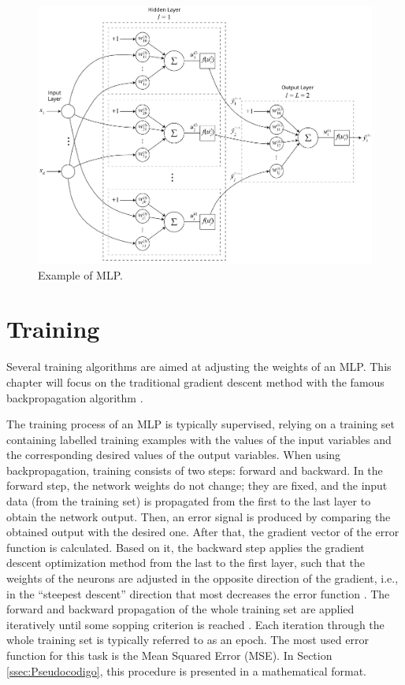 \begin{figure}[h!]
    \centering
    \includegraphics[width=1\textwidth]{"Part 3 - Learning Systems/Supervised Learning/Multilayer Perceptron/figures/MLP_v2@4x.png"}
    \caption{Example of MLP.}
    \label{fig:mlp}
\end{figure}





\section{Training}
\label{ssec:treino}

Several training algorithms are aimed at adjusting the weights of an MLP. This chapter will focus on the traditional gradient descent method with the famous backpropagation algorithm \cite{rumelhart1986learning}.

The training process of an MLP is typically supervised, relying on a training set containing labelled training examples with the values of the input variables and the corresponding desired values of the output variables. When using backpropagation, training consists of two steps: forward and backward. In the forward step, the network weights do not change; they are fixed, and the input data (from the training set) is propagated from the first to the last layer to obtain the network output. Then, an error signal is produced by comparing the obtained output with the desired one. After that, the gradient vector of the error function is calculated. Based on it, the backward step applies the gradient descent optimization method from the last to the first layer, such that the weights of the neurons are adjusted in the opposite direction of the gradient, i.e., in the ``steepest descent'' direction that most decreases the error function \cite{haykin}. The forward and backward propagation of the whole training set are applied iteratively until some sopping criterion is reached \cite{Castro2006FundamentalsON}. Each iteration through the whole training set is typically referred to as an epoch. The most used error function for this task is the Mean Squared Error (MSE).  In Section \ref{ssec:Pseudocodigo}, this procedure is presented in a mathematical format. 

